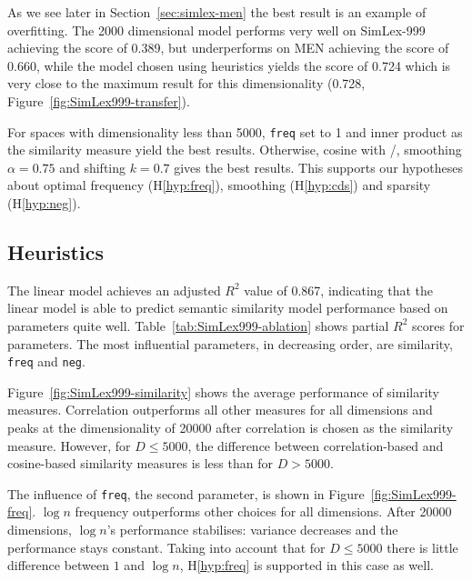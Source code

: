 As we see later in Section~\ref{sec:simlex-men} the best result is an example of overfitting. The 2000 dimensional model performs very well on SimLex-999 achieving the score of 0.389, but underperforms on MEN achieving the score of 0.660, while the model chosen using heuristics yields the score of 0.724 which is very close to the maximum result for this dimensionality (0.728, Figure~\ref{fig:SimLex999-transfer}).

For spaces with dimensionality less than 5000, \texttt{freq} set to 1 and inner product as the similarity measure yield the best results. Otherwise, cosine with \logNSCPMI/, smoothing $\alpha=0.75$ and shifting $k=0.7$ gives the best results. This supports our hypotheses about optimal frequency (H\ref{hyp:freq}), smoothing (H\ref{hyp:cds}) and sparsity (H\ref{hyp:neg}).

\subsection{Heuristics}
\label{sec:heuristics-simlex}



% 

The linear model achieves an adjusted $R^2$ value of 0.867, indicating that the linear model is able to predict semantic similarity model performance based on parameters quite well. Table~\ref{tab:SimLex999-ablation} shows partial $R^2$ scores for parameters. The most influential parameters, in decreasing order, are similarity, \texttt{freq} and \texttt{neg}.




Figure~\ref{fig:SimLex999-similarity} shows the average performance of similarity measures. Correlation outperforms all other measures for all dimensions and peaks at the dimensionality  of 20000 after correlation is chosen as the similarity measure. However, for $D \leq 5000$, the difference between correlation-based and cosine-based similarity measures is less than for $D > 5000$.


The influence of \texttt{freq}, the second parameter, is shown in Figure~\ref{fig:SimLex999-freq}. $\log n$ frequency outperforms other choices for all dimensions. After 20000 dimensions, $\log n$'s performance stabilises: variance decreases and the performance stays constant. Taking into account that for $D \leq 5000$ there is little difference between $1$ and $\log n$, H\ref{hyp:freq} is supported in this case as well.
%
%

